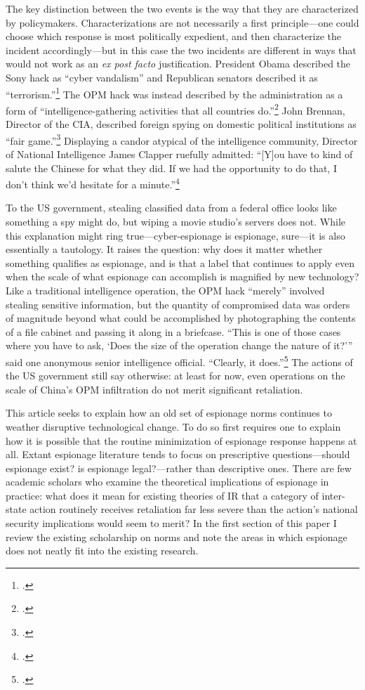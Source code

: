 \documentclass[12pt]{extarticle}
\begin{document}
The key distinction between the two events is the way that they are characterized by policymakers. Characterizations are not necessarily a first principle---one could choose which response is most politically expedient, and then characterize the incident accordingly---but in this case the two incidents are different in ways that would not work as an \emph{ex post facto} justification. President Obama described the Sony hack as \enquote{cyber vandalism} and Republican senators described it as \enquote{terrorism.}\footcite{fung_obama_2014} The OPM hack was instead described by the administration as a form of \enquote{intelligence-gathering activities that all countries do.}\footcite{finklea_cyber_2015} John Brennan, Director of the CIA, described foreign spying on domestic political institutions as ``fair game.''\footcite{sanger_u.s._2016} Displaying a candor atypical of the intelligence community,  Director of National Intelligence James Clapper ruefully admitted: ``[Y]ou have to kind of salute the Chinese for what they did. If we had the opportunity to do that, I don't think we'd hesitate for a minute.''\footcite{pepitone_clapper_2015}

To the US government, stealing classified data from a federal office looks like something a spy might do, but wiping a movie studio's servers does not. While this explanation might ring true---cyber-espionage is espionage, sure---it is also essentially a tautology. It raises the question: why does it matter whether something qualifies as espionage, and is that a label that continues to apply even when the scale of what espionage can accomplish is magnified by new technology? Like a traditional intelligence operation, the OPM hack \enquote{merely} involved stealing sensitive information, but the quantity of compromised data was orders of magnitude beyond what could be accomplished by photographing the contents of a file cabinet and passing it along in a briefcase. \enquote{This is one of those cases where you have to ask, `Does the size of the operation change the nature of it?'\thinspace} said one anonymous senior intelligence official. \enquote{Clearly, it does.}\footcite{sanger_u.s._2015} The actions of the US government still say otherwise: at least for now, even operations on the scale of China's OPM infiltration do not merit significant retaliation.

This article seeks to explain how an old set of espionage norms continues to weather disruptive technological change. To do so first requires one to explain how it is possible that the routine minimization of espionage response happens at all. Extant espionage literature tends to focus on prescriptive questions---should espionage exist? is espionage legal?---rather than descriptive ones. There are few academic scholars who examine the theoretical implications of espionage in practice: what does it mean for existing theories of IR that a category of inter-state action routinely receives retaliation far less severe than the action's national security implications would seem to merit? In the first section of this paper I review the existing scholarship on norms and note the areas in which espionage does not neatly fit into the existing research.
\end{document}
